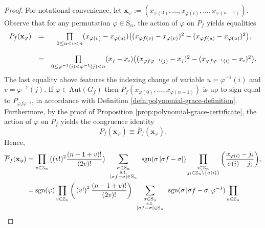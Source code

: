 \begin{proof}
For notational convenience, let $\mathbf{x}_{\varphi}:=(x_{\varphi(0)},\ldots,x_{\varphi(i)},\ldots,x_{\varphi(n-1)})$. Observe that for any permutation $\varphi\in \text{S}_n$, the action of $\varphi$ on $P_f$ yields equalities
 \[
 \begin{array}{ccc}
P_{f}({\bf x}_{\varphi}) & = & \underset{0\le u<v<n}{\prod}(x_{\varphi(v)}-x_{\varphi(u)})\big((x_{\varphi f(v)}-x_{\varphi(v)})^{2}-(x_{\varphi f(u)}-x_{\varphi(u)})^{2}\big),\\
\\
 & = & \underset{0\le\varphi^{-1}(i)<\varphi^{-1}(j)<n}{\prod}(x_{j}-x_{i})\big((x_{\varphi f\varphi^{-1}(j)}-x_{j})^{2}-(x_{\varphi f\varphi^{-1}(i)}-x_{i})^{2}\big).
\end{array}
 \]
 The last equality above features the indexing change of variable $u=\varphi^{-1}(i)$ and $v=\varphi^{-1}(j)$. If $\varphi \in \text{Aut}\left(G_f\right)$ then $P_{f}(x_{\varphi(0)},\ldots,x_{\varphi(n-1)})$ is up to sign equal to $P_{\varphi f\varphi^{-1}}$, in accordance with Definition \ref{defn:polynomial-grace-definition}. Furthermore, by the proof of Proposition \ref{prop:polynomial-grace-certificate}, the action of $\varphi$
on $P_{f}$ yields the congruence identity
\[
P_{f}(\mathbf{x}_{\varphi})\equiv \overline{P}_f(\mathbf{x}_{\varphi}).
\]
Hence,
\begin{align*}\overline{P}_{f}({\bf x}_{\varphi}) & =\prod_{v\in\mathbb{Z}_{n}}\big((v!)^{2}\frac{(n-1+v)!}{(2v)!}\big)\sum_{\begin{array}{c}
\substack{\sigma\in\text{S}_{n}\\
\text{s.t.}\\
\left|\sigma f-\sigma\right|\in\text{S}_{n}
}
\end{array}}\text{sgn}(\sigma\left|\sigma f-\sigma\right|)\prod_{\substack{i\in\mathbb{Z}_{n}\\
j_{i}\in\mathbb{Z}_{n}\backslash\{\sigma(i)\}
}
}\bigg(\frac{x_{\varphi(i)}-j_{i}}{\sigma(i)-j_{i}}\bigg),\\
 & =\text{sgn}(\varphi)\prod_{v\in\mathbb{Z}_{n}}\bigg(\left(v!\right)^{2}\frac{\left(n-1+v\right)!}{\left(2v\right)!}\bigg)\sum_{\begin{array}{c}
\substack{\sigma\in\text{S}_{n}\\
\text{s.t.}\\
\left|\sigma f-\sigma\right|\in\text{S}_{n}
}
\end{array}}\text{sgn}(\sigma\left|\sigma f-\sigma\right|\varphi^{-1})\prod_{\substack{u\in\mathbb{Z}_{n}\\
}}
\end{align*}
\end{proof}
